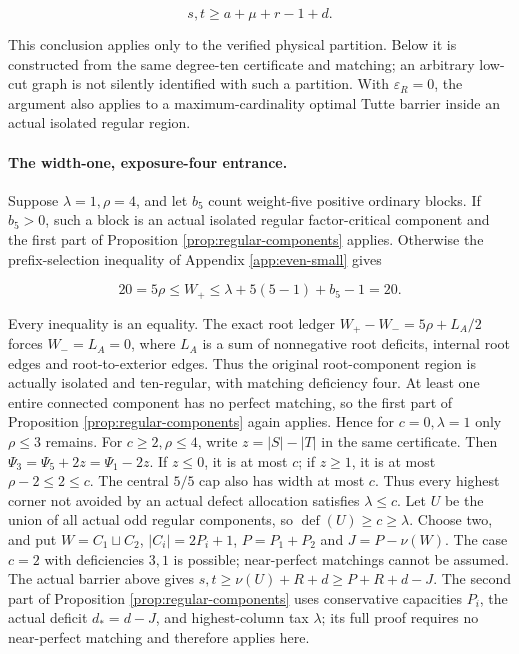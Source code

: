\documentclass[11pt,a4paper]{article}
\theoremstyle{definition}
\begin{document}
\begin{equation}\label{eq:D10-strong}
 s,t\ge a+\mu+r-1+d.
\end{equation}

This conclusion applies only to the verified physical partition. Below it is constructed from the same degree-ten certificate and matching; an arbitrary low-cut graph is not silently identified with such a partition. With $\varepsilon_R=0$, the argument also applies to a maximum-cardinality optimal Tutte barrier inside an actual isolated regular region.

\paragraph{The width-one, exposure-four entrance.}
Suppose $\lambda=1,\rho=4$, and let $b_5$ count weight-five positive ordinary blocks. If $b_5>0$, such a block is an actual isolated regular factor-critical component and the first part of Proposition \ref{prop:regular-components} applies. Otherwise the prefix-selection inequality of Appendix \ref{app:even-small} gives

\[
 20=5\rho\le W_+\le\lambda+5(5-1)+b_5-1=20.
\]

Every inequality is an equality. The exact root ledger $W_+-W_-=5\rho+L_A/2$ forces $W_-=L_A=0$, where $L_A$ is a sum of nonnegative root deficits, internal root edges and root-to-exterior edges. Thus the original root-component region is actually isolated and ten-regular, with matching deficiency four. At least one entire connected component has no perfect matching, so the first part of Proposition \ref{prop:regular-components} again applies. Hence for $c=0,\lambda=1$ only $\rho\le3$ remains.
For $c\ge2,\rho\le4$, write $z=|S|-|T|$ in the same certificate.
Then $\Psi_3=\Psi_5+2z=\Psi_1-2z$. If $z\le0$, it is at most $c$;
if $z\ge1$, it is at most $\rho-2\le2\le c$.
The central $5/5$ cap also has width at most $c$. Thus every highest corner
not avoided by an actual defect allocation satisfies $\lambda\le c$.
Let $U$ be the union of all actual odd regular components, so
$\operatorname{def}(U)\ge c\ge\lambda$.
Choose two, and put $W=C_1\sqcup C_2$, $|C_i|=2P_i+1$,
$P=P_1+P_2$ and $J=P-\nu(W)$.
The case $c=2$ with deficiencies $3,1$ is possible; near-perfect matchings cannot be assumed.
The actual barrier above gives $s,t\ge\nu(U)+R+d\ge P+R+d-J$.
The second part of Proposition \ref{prop:regular-components} uses conservative
capacities $P_i$, the actual deficit $d_*=d-J$, and highest-column tax $\lambda$;
its full proof requires no near-perfect matching and therefore applies here.
\end{document}
